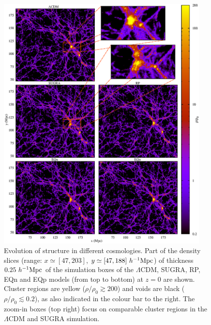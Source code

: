 \begin{figure}
\includegraphics[width=0.95\textwidth]{ch_voidsde/img/model_comparison_all5}
\caption{Evolution of structure in different cosmologies. Part of the density slices (range: $x \simeq [47, 203]$,
$y \simeq [47, 188]~h^{-1} {\rm Mpc}$) of thickness $0.25~h^{-1} {\rm Mpc}$ of the simulation boxes of the $\Lambda$CDM, SUGRA, RP, EQn and EQp
models (from top to bottom) at $z=0$ are shown. Cluster regions are yellow ($\rho/\rho_0 \gtrsim 200$) and voids are black 
($\rho/\rho_0 \lesssim 0.2$), as also indicated in the colour bar to the right. The 
zoom-in boxes (top right) focus on comparable cluster regions in the $\Lambda$CDM and SUGRA simulation. }
\label{fig:model-comparison-all5}
\end{figure}

